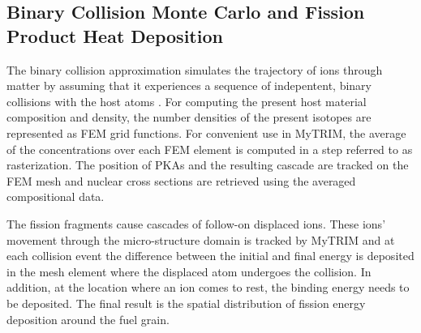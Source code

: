 \documentclass{anstrans}
\begin{document}
\subsection{Binary Collision Monte Carlo and Fission Product Heat Deposition}
The binary collision approximation simulates the trajectory of ions through matter by assuming that it experiences a sequence of indepentent, binary collisions with the host atoms \cite{SRIM}. For computing the present host material composition and density, the number densities of the present isotopes are represented as FEM grid functions. For convenient use in MyTRIM, the average of the concentrations over each FEM element is computed in a step referred to as rasterization. The position of PKAs and the resulting cascade are tracked on the FEM mesh and nuclear cross sections are retrieved using the averaged compositional data. 

The fission fragments cause cascades of follow-on displaced ions. These ions' movement through the micro-structure domain is tracked by MyTRIM and at each collision event the difference between the initial and final energy is deposited in the mesh element where the displaced atom undergoes the collision. In addition, at the location where an ion comes to rest, the binding energy needs to be deposited. The final result is
the spatial distribution of fission energy deposition around the fuel grain. 


\end{document}
